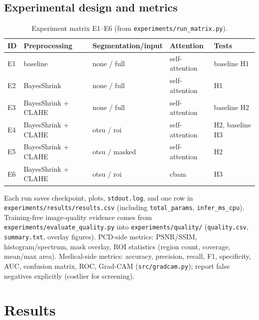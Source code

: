 \documentclass[a4paper,fleqn]{cas-sc}
\begin{document}
\subsection{Experimental design and metrics}\label{sec:design}
\begin{table}[width=\textwidth,pos=ht]
\caption{Experiment matrix E1--E6 (from \texttt{experiments/run\_matrix.py}).}\label{tbl:matrix}
\begin{tabular*}{\tblwidth}{@{}llllL@{}}
\toprule
ID & Preprocessing & Segmentation/input & Attention & Tests \\
\midrule
E1 & baseline & none / full & self-attention & baseline H1 \\
E2 & BayesShrink & none / full & self-attention & H1 \\
E3 & BayesShrink + CLAHE & none / full & self-attention & baseline H2 \\
E4 & BayesShrink + CLAHE & otsu / roi & self-attention & H2, baseline H3 \\
E5 & BayesShrink + CLAHE & otsu / masked & self-attention & H2 \\
E6 & BayesShrink + CLAHE & otsu / roi & cbam & H3 \\
\bottomrule
\end{tabular*}
\end{table}

Each run saves checkpoint, plots, \texttt{stdout.log}, and one row in \texttt{experiments/results/results.csv} (including \texttt{total\_params}, \texttt{infer\_ms\_cpu}). Training-free image-quality evidence comes from \texttt{experiments/evaluate\_quality.py} into \texttt{experiments/quality/} (\texttt{quality.csv}, \texttt{summary.txt}, overlay figures).
PCD-side metrics: PSNR/SSIM, histogram/spectrum, mask overlay, ROI statistics (region count, coverage, mean/max area). Medical-side metrics: accuracy, precision, recall, F1, specificity, AUC, confusion matrix, ROC, Grad-CAM (\texttt{src/gradcam.py}); report false negatives explicitly (costlier for screening).

\section{Results}\label{sec:results}
\end{document}

